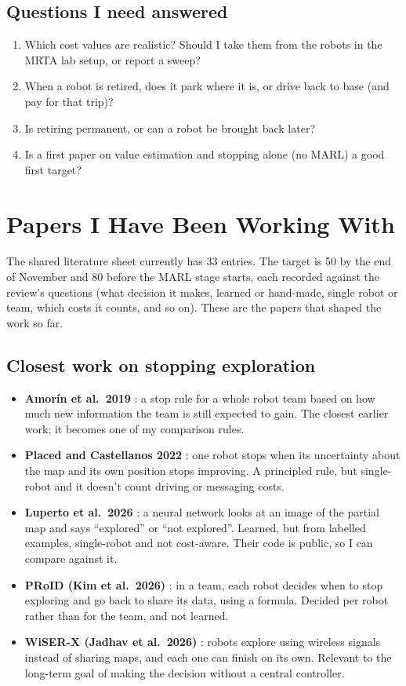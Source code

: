\documentclass[11pt,a4paper]{article}
\begin{document}
\subsection{Questions I need answered}
\begin{enumerate}
  \item Which cost values are realistic? Should I take them from the robots in the MRTA lab setup, or report a sweep?
  \item When a robot is retired, does it park where it is, or drive back to base (and pay for that trip)?
  \item Is retiring permanent, or can a robot be brought back later?
  \item Is a first paper on value estimation and stopping alone (no MARL) a good first target?
\end{enumerate}

\section{Papers I Have Been Working With}

The shared literature sheet currently has 33 entries. The target is 50 by the end of November and 80 before the MARL stage starts, each recorded against the review's questions (what decision it makes, learned or hand-made, single robot or team, which costs it counts, and so on). These are the papers that shaped the work so far.

\subsection{Closest work on stopping exploration}
\begin{itemize}
  \item \textbf{Amorín et al.\ 2019} \cite{amorin2019}: a stop rule for a whole robot team based on how much new information the team is still expected to gain. The closest earlier work; it becomes one of my comparison rules.
  \item \textbf{Placed and Castellanos 2022} \cite{placed2022}: one robot stops when its uncertainty about the map and its own position stops improving. A principled rule, but single-robot and it doesn't count driving or messaging costs.
  \item \textbf{Luperto et al.\ 2026} \cite{luperto2026}: a neural network looks at an image of the partial map and says ``explored'' or ``not explored''. Learned, but from labelled examples, single-robot and not cost-aware. Their code is public, so I can compare against it.
  \item \textbf{PRoID (Kim et al.\ 2026)} \cite{kim2026proid}: in a team, each robot decides when to stop exploring and go back to share its data, using a formula. Decided per robot rather than for the team, and not learned.
  \item \textbf{WiSER-X (Jadhav et al.\ 2026)} \cite{jadhav2026wiserx}: robots explore using wireless signals instead of sharing maps, and each one can finish on its own. Relevant to the long-term goal of making the decision without a central controller.
\end{itemize}
\end{document}
